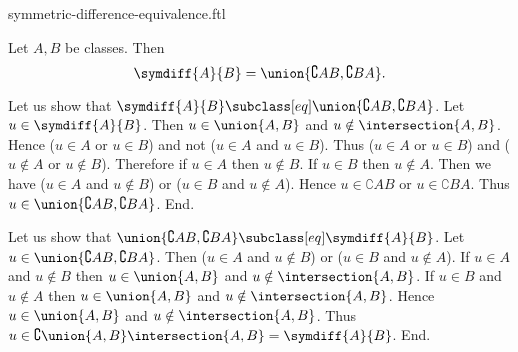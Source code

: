 \documentclass{article}
\begin{document}
\begin{smodule}[creators={Marcel Schütz}]{symmetric-difference-equivalence.ftl}

  \begin{fproposition*}[label=1069307565965312]
    Let $A, B$ be classes.
    Then \[\symdiff{A}{B} = \union{\complement{A}{B},\complement{B}{A}}.\]
  \end{fproposition*}
  \begin{fproof}
    Let us show that $\symdiff{A}{B} \subclass[eq] \union{\complement{A}{B},\complement{B}{A}}$.
      Let $u \in \symdiff{A}{B}$.
      Then $u \in \union{A,B}$ and $u \notin \intersection{A,B}$.
      Hence ($u \in A$ or $u \in B$) and not ($u \in A$ and $u \in B$).
      Thus ($u \in A$ or $u \in B$) and ($u \notin A$ or $u \notin B$).
      Therefore if $u \in A$ then $u \notin B$.
      If $u \in B$ then $u \notin A$.
      Then we have ($u \in A$ and $u \notin B$) or ($u \in B$ and $u \notin A$).
      Hence $u \in \complement{A}{B}$ or $u \in \complement{B}{A}$.
      Thus $u \in \union{\complement{A}{B},\complement{B}{A}}$.
    End.

    Let us show that $\union{\complement{A}{B},\complement{B}{A}} \subclass[eq] \symdiff{A}{B}$.
      Let $u \in \union{\complement{A}{B},\complement{B}{A}}$.
      Then ($u \in A$ and $u \notin B$) or ($u \in B$ and $u \notin A$).
      If $u \in A$ and $u \notin B$ then $u \in \union{A,B}$ and $u \notin \intersection{A,B}$.
      If $u \in B$ and $u \notin A$ then $u \in \union{A,B}$ and $u \notin \intersection{A,B}$.
      Hence $u \in \union{A,B}$ and $u \notin \intersection{A,B}$.
      Thus $u \in \complement{\union{A,B}}{\intersection{A,B}} = \symdiff{A}{B}$.
    End.
  \end{fproof}
\end{smodule}
\end{document}
